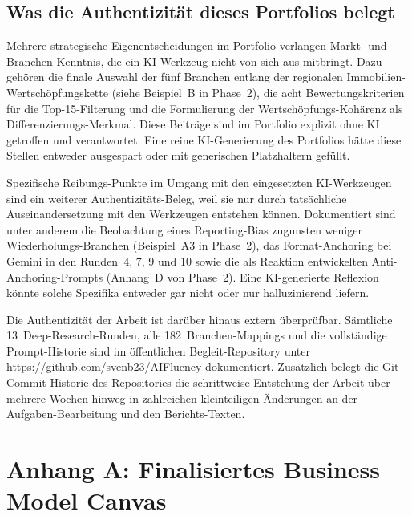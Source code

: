 \documentclass[a4paper,11pt]{article}
\begin{document}
\subsection{Was die Authentizität dieses Portfolios belegt}

Mehrere strategische Eigenentscheidungen im Portfolio verlangen
Markt- und Branchen-Kenntnis, die ein KI-Werkzeug nicht von sich aus
mitbringt. Dazu gehören die finale Auswahl der fünf Branchen entlang
der regionalen Immobilien-Wertschöpfungskette (siehe Beispiel~B in
Phase~2), die acht Bewertungskriterien für die Top-15-Filterung und
die Formulierung der Wertschöpfungs-Kohärenz als
Differenzierungs-Merkmal. Diese Beiträge sind im Portfolio explizit
ohne KI getroffen und verantwortet. Eine reine KI-Generierung des
Portfolios hätte diese Stellen entweder ausgespart oder mit
generischen Platzhaltern gefüllt.

Spezifische Reibungs-Punkte im Umgang mit den eingesetzten
KI-Werkzeugen sind ein weiterer Authentizitäts-Beleg, weil sie nur
durch tatsächliche Auseinandersetzung mit den Werkzeugen entstehen
können. Dokumentiert sind unter anderem die Beobachtung eines
Reporting-Bias zugunsten weniger Wiederholungs-Branchen
(Beispiel~A3 in Phase~2), das Format-Anchoring bei Gemini in den
Runden~4, 7, 9 und 10 sowie die als Reaktion entwickelten
Anti-Anchoring-Prompts (Anhang~D von Phase~2). Eine KI-generierte
Reflexion könnte solche Spezifika entweder gar nicht oder nur
halluzinierend liefern.

Die Authentizität der Arbeit ist darüber hinaus extern überprüfbar.
Sämtliche 13~Deep-Research-Runden, alle 182~Branchen-Mappings und die
vollständige Prompt-Historie sind im öffentlichen Begleit-Repository
unter \url{https://github.com/svenb23/AIFluency} dokumentiert.
Zusätzlich belegt die Git-Commit-Historie des Repositories die
schrittweise Entstehung der Arbeit über mehrere Wochen hinweg in
zahlreichen kleinteiligen Änderungen an der Aufgaben-Bearbeitung und
den Berichts-Texten.
\newpage

\section*{Anhang A: Finalisiertes Business Model Canvas}
\end{document}
